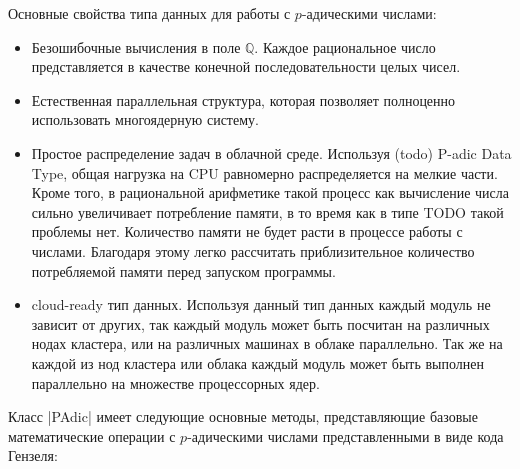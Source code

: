 \documentclass[master, och, diploma, times]{sty/SCWorks}
\theoremstyle{plain}
\theoremstyle{definition}
\begin{document}
Основные свойства типа данных для работы с $p$-адическими числами:

\begin{itemize}
\item Безошибочные вычисления в поле $\mathbb{Q}$. Каждое рациональное число представляется в качестве конечной последовательности целых чисел.
\item Естественная параллельная структура, которая позволяет полноценно использовать многоядерную систему.
\item Простое распределение задач в облачной среде. Используя (todo) P-adic Data Type, общая нагрузка на CPU равномерно распределяется на мелкие части. Кроме того, в рациональной арифметике такой процесс как вычисление числа сильно увеличивает потребление памяти, в то время как в типе TODO такой проблемы нет. Количество памяти не будет расти в процессе работы с числами. Благодаря этому легко рассчитать приблизительное количество потребляемой памяти перед запуском программы.
\item cloud-ready тип данных. Используя данный тип данных каждый модуль не зависит от других, так каждый модуль может быть посчитан на различных нодах кластера, или на различных машинах в облаке параллельно. Так же на каждой из нод кластера или облака каждый модуль может быть выполнен параллельно на множестве процессорных ядер.

\end{itemize}

Класс |PAdic| имеет следующие основные методы, представляющие базовые математические операции с $p$-адическими числами представленными в виде кода Гензеля:
\end{document}
